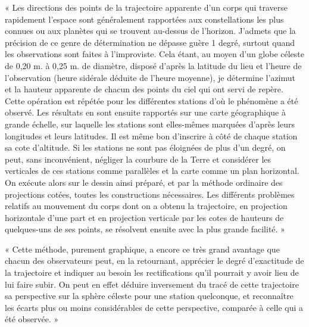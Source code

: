 \documentclass[a4paper, 11pt, oneside, polutonikogreek, french]{article}
\begin{document}
« Les directions des points de la trajectoire apparente d'un corps qui traverse rapidement l'espace sont généralement rapportées aux constellations les plus connues ou aux planètes qui se trouvent au-dessus de l'horizon. J'admets que la précision de ce genre de détermination ne dépasse guère 1 degré, surtout quand les observations sont faites à l'improviste. Cela étant, au moyen d'un globe céleste de 0,20 m. à 0,25 m. de diamètre, disposé d'après la latitude du lieu et l'heure de l'observation (heure sidérale déduite de l'heure moyenne), je détermine l'azimut et la hauteur apparente de chacun des points du ciel qui ont servi de repère. Cette opération est répétée pour les différentes stations d'où le phénomène a été observé. Les résultats en sont ensuite rapportés sur une carte géographique à grande échelle, sur laquelle les stations sont elles-mêmes marquées d'après leurs longitudes et leurs latitudes. Il est même bon d'inscrire à côté de chaque station sa cote d'altitude. Si les stations ne sont pas éloignées de plus d'un degré, on peut, sans inconvénient, négliger la courbure de la Terre et considérer les verticales de ces stations comme parallèles et la carte comme un plan horizontal. On exécute alors sur le dessin ainsi préparé, et par la méthode ordinaire des projections cotées, toutes les constructions nécessaires. Les différents problèmes relatifs au mouvement du corps dont on a obtenu la trajectoire, en projection horizontale d'une part et en projection verticale par les cotes de hauteurs de quelques-uns de ses points, se résolvent ensuite avec la plus grande facilité. »

« Cette méthode, purement graphique, a encore ce très grand avantage que chacun des observateurs peut, en la retournant, apprécier le degré d'exactitude de la trajectoire et indiquer au besoin les rectifications qu'il pourrait y avoir lieu de lui faire subir. On peut en effet déduire inversement du tracé de cette trajectoire sa perspective sur la sphère céleste pour une station quelconque, et reconnaître les écarts plus ou moins considérables de cette perspective, comparée à celle qui a été observée. »
\end{document}

